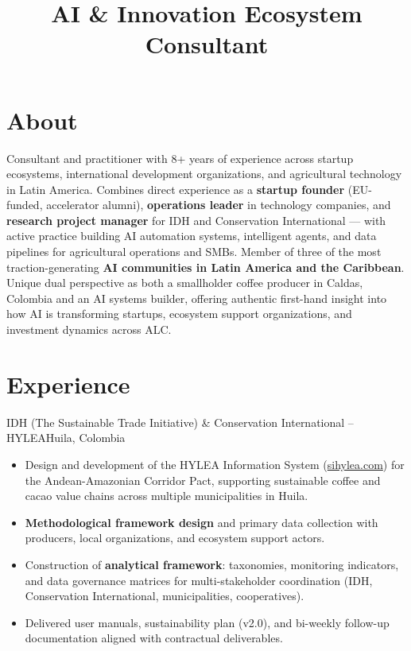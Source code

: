 \documentclass[11pt,a4paper,sans]{moderncv}
\title{AI \& Innovation Ecosystem Consultant}
\begin{document}
\makecvtitle

\section{About}
Consultant and practitioner with 8+ years of experience across startup ecosystems,
international development organizations, and agricultural technology in Latin America.
Combines direct experience as a \textbf{startup founder} (EU-funded, accelerator alumni),
\textbf{operations leader} in technology companies, and \textbf{research project manager}
for IDH and Conservation International — with active practice building AI automation
systems, intelligent agents, and data pipelines for agricultural operations and SMBs.
Member of three of the most traction-generating \textbf{AI communities in Latin America
and the Caribbean}. Unique dual perspective as both a smallholder coffee producer in
Caldas, Colombia and an AI systems builder, offering authentic first-hand insight into
how AI is transforming startups, ecosystem support organizations, and investment
dynamics across ALC.

\section{Experience}

%
{IDH (The Sustainable Trade Initiative) \& Conservation International -- HYLEA}{Huila, Colombia}{}{%
\begin{itemize}
  \item Design and development of the HYLEA Information System (\href{https://sihylea.com}{sihylea.com}) for the
        Andean-Amazonian Corridor Pact, supporting sustainable coffee and cacao
        value chains across multiple municipalities in Huila.
  \item \textbf{Methodological framework design} and primary data collection with
        producers, local organizations, and ecosystem support actors.
  \item Construction of \textbf{analytical framework}: taxonomies, monitoring indicators,
        and data governance matrices for multi-stakeholder coordination (IDH, Conservation
        International, municipalities, cooperatives).
  \item Delivered user manuals, sustainability plan (v2.0), and bi-weekly follow-up
        documentation aligned with contractual deliverables.
\end{itemize}}
\end{document}
